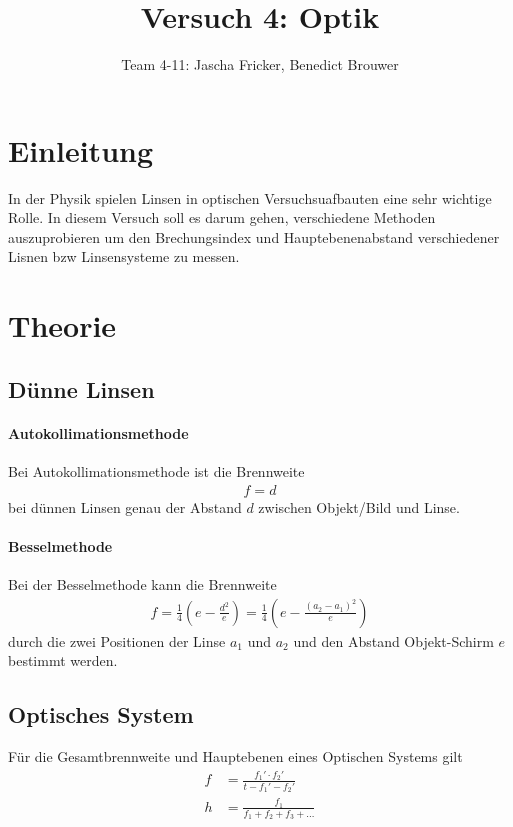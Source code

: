 \documentclass[11pt, a4paper]{article}
\title{Versuch 4: Optik}
\author{Team 4-11: Jascha Fricker, Benedict Brouwer}
\begin{document}
    \maketitle

    \tableofcontents

    \newpage

    \section{Einleitung}
    In der Physik spielen Linsen in optischen Versuchsuafbauten eine sehr wichtige Rolle. In diesem Versuch soll es darum gehen, verschiedene 
    Methoden auszuprobieren um den Brechungsindex und Hauptebenenabstand verschiedener Lisnen bzw Linsensysteme zu messen.

    \section{Theorie}

    \subsection{Dünne Linsen}
    \paragraph{Autokollimationsmethode}
    Bei Autokollimationsmethode ist die Brennweite
    \begin{align}
        f = d \label{eq:auto}
    \end{align}
    bei dünnen Linsen genau der Abstand $d$ zwischen Objekt/Bild und Linse.
    \paragraph{Besselmethode}
    Bei der Besselmethode kann die Brennweite
    \begin{align}
        f = \frac{1}{4} \left( e - \frac{d^2}{e} \right) = \frac{1}{4} \left( e - \frac{\left(a_2 - a_1\right)^2}{e} \right) \label{eq:bessel}
    \end{align}
    durch die zwei Positionen der Linse $a_1$ und $a_2$ und den Abstand Objekt-Schirm $e$ bestimmt werden.
    
    \subsection{Optisches System}

    Für die Gesamtbrennweite und Hauptebenen eines Optischen Systems gilt
    \begin{align}
        f &= \frac{f_1' \cdot f_2'}{t - f_1' - f_2'} \label{eq:brenn}\\
        h &= \frac{f_1}{f_1 + f_2 + f_3 + \dots} \label{eq:ebene}
    \end{align}
\end{document}
